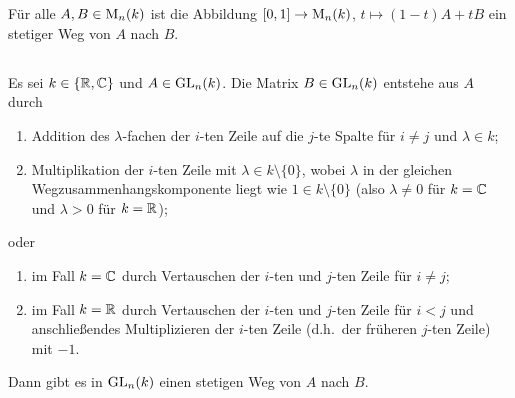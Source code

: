 \section{}





\subsection{}

Für alle $A, B \in \operatorname{M}_{n}(k)$ ist die Abbildung $[0,1] \to \operatorname{M}_{n}(k)$, $t \mapsto (1-t)A + tB$ ein stetiger Weg von $A$ nach $B$.





\subsection{}


\begin{proposition}
  \label{proposition: elemantery row operations}
  Es sei $k \in \{\mathbb{R}, \mathbb{C}\}$ und $A \in \operatorname{GL}_{n}(k)$.
  Die Matrix $B \in \operatorname{GL}_{n}(k)$ entstehe aus $A$ durch
  \begin{enumerate}[label = \alph*)]
    \item
      \label{operation: adding multiples to other rows}
      Addition des $\lambda$-fachen der $i$-ten Zeile auf die $j$-te Spalte für $i \neq j$ und $\lambda \in k$;
    \item
      \label{operation: scaling rows}
      Multiplikation der $i$-ten Zeile mit $\lambda \in k \setminus \{0\}$, wobei $\lambda$ in der gleichen Wegzusammenhangskomponente liegt wie $1 \in k \setminus \{0\}$
      (also $\lambda \neq 0$ für $k = \mathbb{C}$ und $\lambda > 0$ für $k = \mathbb{R}$);
  \end{enumerate}
  oder
  \begin{enumerate}[label = \alph*), resume]
    \item
      \label{operation: swapping rows}
      im Fall $k = \mathbb{C}$ durch Vertauschen der $i$-ten und $j$-ten Zeile für $i \neq j$;
    \item
      \label{operation: modified swapping rows}
      im Fall $k = \mathbb{R}$ durch Vertauschen der $i$-ten und $j$-ten Zeile für $i < j$ und anschließendes Multiplizieren der $i$-ten Zeile (d.h.\ der früheren $j$-ten Zeile) mit $-1$.
  \end{enumerate}
  Dann gibt es in $\operatorname{GL}_{n}(k)$ einen stetigen Weg von $A$ nach $B$.
\end{proposition}

